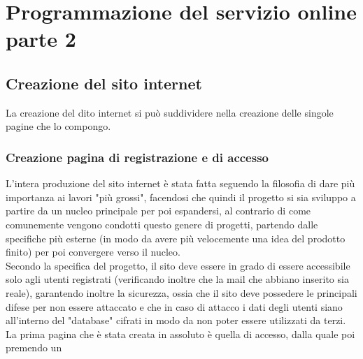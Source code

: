 \chapter{Programmazione del servizio online parte 2}\label{cap:Programmazione del servizio online parte 2}

\section{Creazione del sito internet}\label{sez:Creazione sito internet}

La creazione del dito internet si può suddividere nella creazione delle singole pagine che lo compongo.

\subsection{Creazione pagina di registrazione e di accesso}
L'intera produzione del sito internet è stata fatta seguendo la filosofia di dare più importanza ai lavori "più grossi", facendosi che quindi il progetto si sia sviluppo a partire da un nucleo principale per poi espandersi, al contrario di  come comunemente vengono condotti questo genere di progetti, partendo dalle specifiche più esterne (in modo da avere più velocemente una idea del prodotto finito) per poi convergere verso il nucleo.\\
Secondo la specifica del progetto, il sito deve essere in grado di essere accessibile solo agli utenti registrati (verificando inoltre che la mail che abbiano inserito sia reale), garantendo inoltre la sicurezza, ossia che il sito deve possedere le principali difese per non essere attaccato e che in caso di attacco i dati degli utenti siano all'interno del "database" cifrati in modo da non poter essere utilizzati da terzi.\\
La prima pagina che è stata creata in assoluto è quella di accesso, dalla quale poi premendo un  